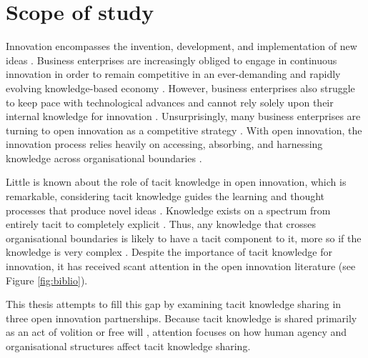  \section{Scope of study}

Innovation encompasses the invention, development, and implementation of new ideas \citep{garud2013perspectives,bessant2013innovation}. Business enterprises are increasingly obliged to engage in continuous innovation in order to remain competitive in an ever-demanding and rapidly evolving knowledge-based economy \citep{lubit2001keys,urbancova2013competitive,lee2019does,jackson2020fostering}. However, business enterprises also struggle to keep pace with technological advances and cannot rely solely upon their internal knowledge for innovation \citep{nunes2020managing}. Unsurprisingly, many business enterprises are turning to open innovation as a competitive strategy \citep{stanko2017under,lee2019does}. With open innovation, the innovation process relies heavily on accessing, absorbing, and harnessing knowledge across organisational boundaries \citep{chesbrough2017future}. \medskip

Little is known about the role of tacit knowledge in open innovation, which is remarkable, considering tacit knowledge guides the learning and thought processes that produce novel ideas \citep{leonard1998role}. Knowledge exists on a spectrum from entirely tacit to completely explicit \citep{leonard1998role}. Thus, any knowledge that crosses organisational boundaries is likely to have a tacit component to it, more so if the knowledge is very complex \citep{seidler2008use,szulanski2016overcoming}. Despite the importance of tacit knowledge for innovation, it has received scant attention in the open innovation literature (see Figure \ref{fig:biblio}). \medskip

This thesis attempts to fill this gap by examining tacit knowledge sharing in three open innovation partnerships. Because tacit knowledge is shared primarily as an act of volition or free will \citep{polanyi1966tacit}, attention focuses on how human agency and organisational structures affect tacit knowledge sharing. \medskip

